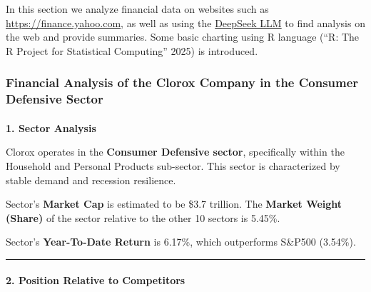 \documentclass[
  letterpaper,
  DIV=11,
  numbers=noendperiod]{scrartcl}
\makeatletter
\let\oldparagraph\paragraph
\renewcommand{\paragraph}{
    \@ifstar
      \xxxParagraphStar
      \xxxParagraphNoStar
  }
\newcommand{\xxxParagraphStar}[1]{\oldparagraph*{#1}\mbox{}}
\newcommand{\xxxParagraphNoStar}[1]{\oldparagraph{#1}\mbox{}}
\makeatother
\begin{document}
\begin{tcolorbox}[enhanced jigsaw, title=\textcolor{quarto-callout-note-color}{\faInfo}\hspace{0.5em}{Note}, left=2mm, toptitle=1mm, arc=.35mm, opacityback=0, rightrule=.15mm, colbacktitle=quarto-callout-note-color!10!white, toprule=.15mm, bottomtitle=1mm, colback=white, titlerule=0mm, bottomrule=.15mm, leftrule=.75mm, breakable, opacitybacktitle=0.6, coltitle=black, colframe=quarto-callout-note-color-frame]

In this section we analyze financial data on websites such as
\url{https://finance.yahoo.com}, as well as using the
\href{https://chat.deepseek.com/}{DeepSeek LLM} to find analysis on the
web and provide summaries. Some basic charting using R language ({``R:
{The R Project} for {Statistical Computing}''} 2025) is introduced.

\end{tcolorbox}

\subsubsection{\texorpdfstring{\textbf{Financial Analysis of the Clorox
Company in the Consumer Defensive
Sector}}{Financial Analysis of the Clorox Company in the Consumer Defensive Sector}}\label{financial-analysis-of-the-clorox-company-in-the-consumer-defensive-sector}

\paragraph{\texorpdfstring{\textbf{1. Sector
Analysis}}{1. Sector Analysis}}\label{sector-analysis-1}

Clorox operates in the \textbf{Consumer Defensive sector}, specifically
within the Household and Personal Products sub-sector. This sector is
characterized by stable demand and recession resilience.

Sector's \textbf{Market Cap} is estimated to be \$3.7 trillion. The
\textbf{Market Weight (Share)} of the sector relative to the other 10
sectors is 5.45\%.

Sector's \textbf{Year-To-Date Return} is 6.17\%, which outperforms
S\&P500 (3.54\%).

\begin{center}\rule{0.5\linewidth}{0.5pt}\end{center}

\paragraph{\texorpdfstring{\textbf{2. Position Relative to
Competitors}}{2. Position Relative to Competitors}}\label{position-relative-to-competitors}
\end{document}
